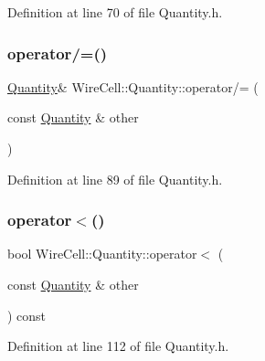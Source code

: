 Definition at line 70 of file Quantity.\+h.

\mbox{\label{class_wire_cell_1_1_quantity_a1aea96e52f639a40217983f77492e105}} 
\subsubsection{\texorpdfstring{operator/=()}{operator/=()}\hspace{0.1cm}{\footnotesize\ttfamily [2/2]}}
{\footnotesize\ttfamily \hyperlink{class_wire_cell_1_1_quantity}{Quantity}\& Wire\+Cell\+::\+Quantity\+::operator/= (\begin{DoxyParamCaption}\item[{const \hyperlink{class_wire_cell_1_1_quantity}{Quantity} \&}]{other }\end{DoxyParamCaption})\hspace{0.3cm}{\ttfamily [inline]}}



Definition at line 89 of file Quantity.\+h.

\mbox{\label{class_wire_cell_1_1_quantity_ac8f33a267d1a7f1af9283bdc18e23c8d}} 
\subsubsection{\texorpdfstring{operator$<$()}{operator<()}}
{\footnotesize\ttfamily bool Wire\+Cell\+::\+Quantity\+::operator$<$ (\begin{DoxyParamCaption}\item[{const \hyperlink{class_wire_cell_1_1_quantity}{Quantity} \&}]{other }\end{DoxyParamCaption}) const\hspace{0.3cm}{\ttfamily [inline]}}



Definition at line 112 of file Quantity.\+h.

\mbox{\label{class_wire_cell_1_1_quantity_a68dc322e300bfe367131389755ae631f}} 
